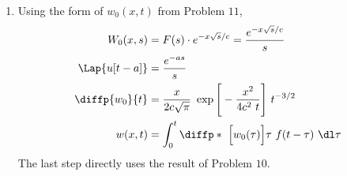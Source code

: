 \begin{enumerate}
    \item Using the form of $ w_0(x, t) $ from Problem $ 11 $,
          \begin{align}
              W_0(x, s)       & = F(s) \cdot e^{-x\sqrt{s}/c}
              = \frac{e^{-x\sqrt{s}/c}}{s}                                          \\
              \Lap\{u[t-a]\}  & = \frac{e^{-as}}{s}                                 \\
              \diffp {w_0}{t} & = \frac{x}{2c\sqrt{\pi}}\
              \exp \Bigg[ - \frac{x^2}{4c^2\ t} \Bigg]\ t^{-3/2}                    \\
              w(x, t)         & = \int_{0}^{t} \diffp*{\ \Big[w_0(\tau)\Big]}{\tau}
              \ f(t - \tau)\ \dl \tau
          \end{align}
          The last step directly uses the result of Problem $ 10 $.
\end{enumerate}